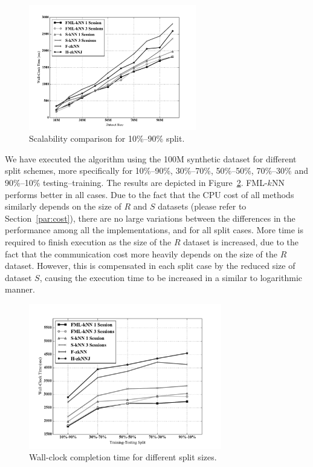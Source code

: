 \begin{figure}[!tb]
	\centering
	\includegraphics[width=0.65\textwidth]{figures/figure6.pdf}
	\caption{Scalability comparison for 10\%--90\% split.}
	\label{figure6}
\end{figure}

We have executed the algorithm using the 100M synthetic dataset for different split schemes, more specifically for 10\%--90\%,  30\%--70\%, 50\%--50\%, 70\%--30\% and 90\%--10\% testing--training. The results are depicted in Figure~\ref{figure7}. FML-$k$NN performs better in all cases. Due to the fact that the CPU cost of all methods similarly depends on the size of $R$ and $S$ datasets (please refer to Section~\ref{par:cost}), there are no large variations between the differences in the performance among all the implementations, and for all split cases. More time is required to finish execution as the size of the $R$ dataset is increased, due to the fact that the communication cost more heavily depends on the size of the $R$ dataset. However, this is compensated in each split case by the reduced size of dataset $S$, causing the execution time to be increased in a similar to logarithmic manner.

\begin{figure}[!tb]
	\centering
	\includegraphics[width=0.75\textwidth]{figures/figure7.pdf}
	\caption{Wall-clock completion time for different split sizes.}
	\label{figure7}
\end{figure}

